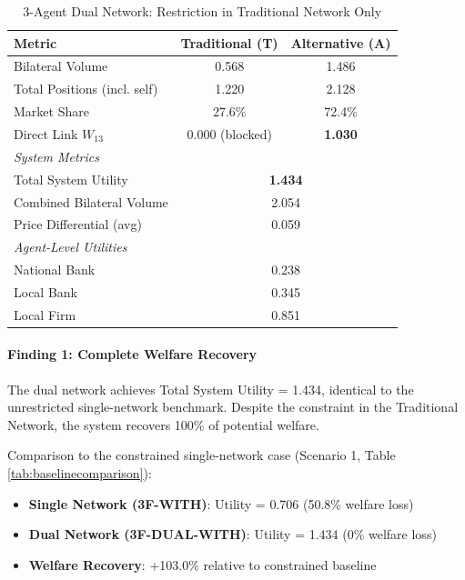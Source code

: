\begin{table}[h]
\centering
\caption{3-Agent Dual Network: Restriction in Traditional Network Only}
\label{tab:3f_dual_restricted}
\begin{tabular}{lcc}
\hline
\textbf{Metric} & \textbf{Traditional (T)} & \textbf{Alternative (A)} \\ \hline
Bilateral Volume & 0.568 & 1.486 \\
Total Positions (incl. self) & 1.220 & 2.128 \\
Market Share & 27.6\% & 72.4\% \\
Direct Link $W_{13}$ & 0.000 (blocked) & \textbf{1.030} \\
\hline
\multicolumn{3}{l}{\textit{System Metrics}} \\
Total System Utility & \multicolumn{2}{c}{\textbf{1.434}} \\
Combined Bilateral Volume & \multicolumn{2}{c}{2.054} \\
Price Differential (avg) & \multicolumn{2}{c}{0.059} \\
\hline
\multicolumn{3}{l}{\textit{Agent-Level Utilities}} \\
National Bank & \multicolumn{2}{c}{0.238} \\
Local Bank & \multicolumn{2}{c}{0.345} \\
Local Firm & \multicolumn{2}{c}{0.851} \\
\hline
\end{tabular}
\end{table}

\paragraph{Finding 1: Complete Welfare Recovery}

The dual network achieves Total System Utility = 1.434, identical to the unrestricted single-network benchmark. Despite the constraint in the Traditional Network, the system recovers 100\% of potential welfare.

Comparison to the constrained single-network case (Scenario 1, Table \ref{tab:baselinecomparison}):
\begin{itemize}
    \item \textbf{Single Network (3F-WITH)}: Utility = 0.706 (50.8\% welfare loss)
    \item \textbf{Dual Network (3F-DUAL-WITH)}: Utility = 1.434 (0\% welfare loss)
    \item \textbf{Welfare Recovery}: +103.0\% relative to constrained baseline
\end{itemize}

